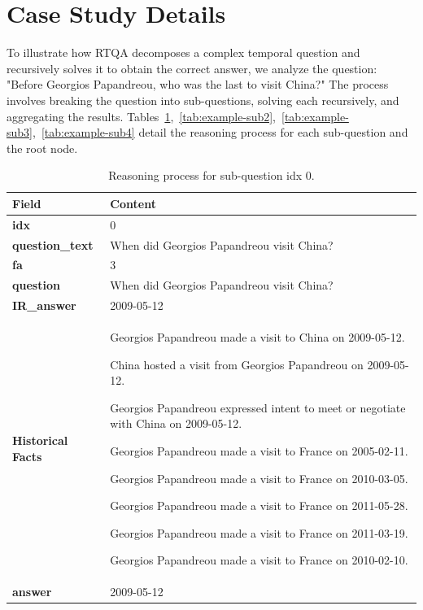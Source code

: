 \documentclass[11pt]{article}
\begin{document}
\section{Case Study Details}
To illustrate how RTQA decomposes a complex temporal question and recursively solves it to obtain the correct answer, we analyze the question: "Before Georgios Papandreou, who was the last to visit China?" The process involves breaking the question into sub-questions, solving each recursively, and aggregating the results. Tables~\ref{tab:example-sub1},~\ref{tab:example-sub2},~\ref{tab:example-sub3},~\ref{tab:example-sub4} detail the reasoning process for each sub-question and the root node.

\begin{table}[]
\caption{Reasoning process for sub-question idx 0.}
\label{tab:example-sub1}
\centering
\small
\begin{tabular}{p{} p{}}
\toprule
\textbf{Field} & \textbf{Content} \\
\midrule
\textbf{idx} & 0 \\
\textbf{question\_text} & When did Georgios Papandreou visit China? \\
\textbf{fa} & 3 \\
\textbf{question} & When did Georgios Papandreou visit China? \\
\textbf{IR\_answer} & 2009-05-12 \\
\midrule
\textbf{Historical Facts} & 
Georgios Papandreou made a visit to China on 2009-05-12. \par
China hosted a visit from Georgios Papandreou on 2009-05-12. \par
Georgios Papandreou expressed intent to meet or negotiate with China on 2009-05-12. \par
Georgios Papandreou made a visit to France on 2005-02-11. \par
Georgios Papandreou made a visit to France on 2010-03-05. \par
Georgios Papandreou made a visit to France on 2011-05-28. \par
Georgios Papandreou made a visit to France on 2011-03-19. \par
Georgios Papandreou made a visit to France on 2010-02-10. \\
\midrule
\textbf{answer} & 2009-05-12 \\
\bottomrule
\end{tabular}

\end{table}
\end{document}
